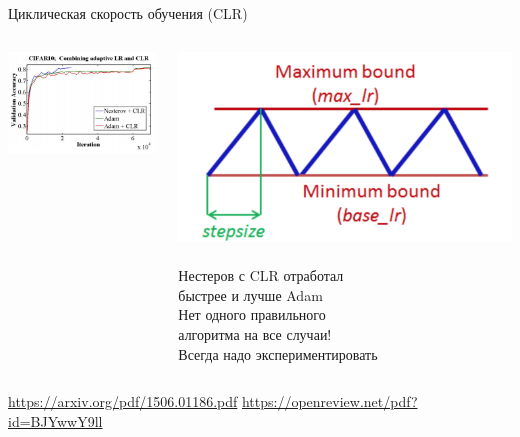 \documentclass[notes,12pt, aspectratio=169]{beamer}
\begin{document}
\begin{frame}{Циклическая скорость обучения (CLR)}
\begin{columns}[T] %
	\begin{column}{.48\textwidth}
		\centering \includegraphics[scale=0.55]{cycle_2.png}
	\end{column}%
	\hfill%
	\begin{column}{.48\textwidth}
		\centering \includegraphics[scale=0.17]{cycle.png} \\ \mbox{ } \\
		Нестеров с CLR отработал \\ быстрее и лучше Adam \\ \alert{Нет одного правильного \\ алгоритма на все случаи!}  \\ Всегда надо экспериментировать
	\end{column}%
\end{columns}

\vfill %
\footnotesize  
\color{blue} \url{https://arxiv.org/pdf/1506.01186.pdf} \newline  \url{https://openreview.net/pdf?id=BJYwwY9ll}
\end{frame}
\end{document}
